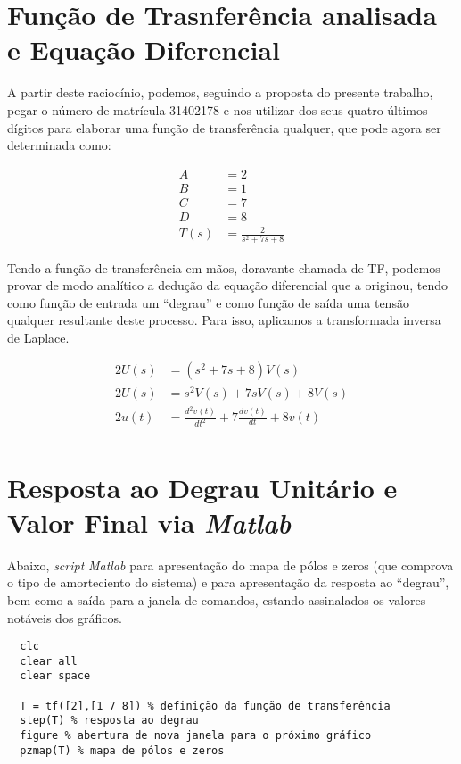 \documentclass[
	article,			%
	11pt,				%
	oneside,			%
	a4paper,			%
	english,			%
	brazil,				%
	sumario=tradicional
	]{abntex2}
\begin{document}
\section{Função de Trasnferência analisada e Equação Diferencial}

A partir deste raciocínio, podemos, seguindo a proposta do presente trabalho, pegar o número
de matrícula 31402178 e nos utilizar dos seus quatro últimos dígitos para elaborar uma
função de transferência qualquer, que pode agora ser determinada como:

\begin{align*}
  A &= 2 \\
  B &= 1 \\
  C &= 7 \\
  D &= 8 \\
  T(s) &= \frac{2}{s^2 + 7 s + 8}
\end{align*}

Tendo a função de transferência em mãos, doravante chamada de TF, podemos provar
de modo analítico a dedução da equação diferencial que a originou, tendo como
função de entrada um ``degrau'' e como função de saída uma tensão qualquer resultante
deste processo. Para isso, aplicamos a transformada inversa de Laplace.

\begin{align*}
  2U(s) &= (s^2 + 7s + 8)V(s) \\
  2U(s) &= s^2 V(s) + 7sV(s) + 8V(s) \\
  2u(t) &= \frac{d^2 v(t)}{dt^2} + 7\frac{d v(t)}{dt} + 8v(t) \\
\end{align*}

\section{Resposta ao Degrau Unitário e Valor Final via \emph{Matlab}}

Abaixo, \emph{script} \emph{Matlab} para apresentação do mapa de pólos e zeros (que comprova o tipo de amorteciento do sistema) e para apresentação da resposta ao ``degrau'', bem como a saída para a janela de comandos, estando assinalados os valores notáveis dos gráficos.

\begin{verbatim}
  clc
  clear all
  clear space

  T = tf([2],[1 7 8]) % definição da função de transferência
  step(T) % resposta ao degrau
  figure % abertura de nova janela para o próximo gráfico
  pzmap(T) % mapa de pólos e zeros
\end{verbatim}
\end{document}
